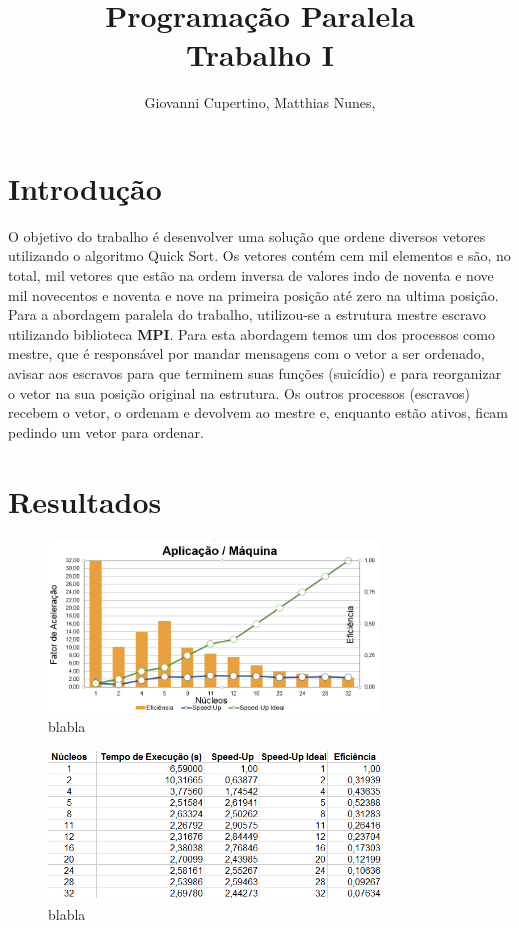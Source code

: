 \documentclass[9pt]{IEEEtran}
\title{Programação Paralela\\ Trabalho I}
\author{Giovanni Cupertino, Matthias Nunes, \IEEEmembership{Usuário pp12820}}
\begin{document}
\maketitle

\section{Introdução}

	O objetivo do trabalho é desenvolver uma solução que ordene diversos vetores
	utilizando o algoritmo Quick Sort.  Os vetores contém cem mil elementos e
	são, no total, mil vetores que estão na ordem inversa de valores indo de
	noventa e nove mil novecentos e noventa e nove na primeira posição até zero
	na ultima posição.  Para a abordagem paralela do trabalho, utilizou-se a
	estrutura mestre escravo utilizando biblioteca \textbf{MPI}. Para esta
	abordagem temos um dos processos como mestre, que é responsável por mandar
	mensagens com o vetor a ser ordenado, avisar aos escravos para que terminem
	suas funções (suicídio) e para reorganizar o vetor na sua posição original
	na estrutura. Os outros processos (escravos) recebem o vetor, o ordenam e
	devolvem ao mestre e, enquanto estão ativos, ficam pedindo um vetor para
	ordenar.

\section{Resultados}

	\begin{figure}[H]
		\centering
		\includegraphics[width=88mm]{doc/graph.png}
		\caption{blabla}
		\label{fig_graph}
	\end{figure}

	\begin{figure}[H]
		\centering
		\includegraphics[width=88mm]{doc/table.png}
		\caption{blabla}
		\label{fig_table}
	\end{figure}
\end{document}
